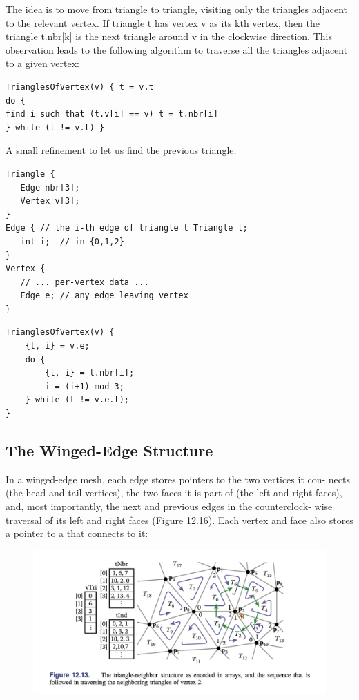 \documentclass[11pt]{article}
\numberwithin{equation}{section}
\begin{document}
The idea is to move from triangle to triangle, visiting only the triangles adjacent to the relevant vertex. If triangle t has vertex v as its kth vertex, then the triangle t.nbr[k] is the next triangle around v in the clockwise direction. This observation leads to the following algorithm to traverse all the triangles adjacent to a given vertex:
\begin{framed}
\begin{verbatim}
TrianglesOfVertex(v) { t = v.t
do {
find i such that (t.v[i] == v) t = t.nbr[i]
} while (t != v.t) }
\end{verbatim}
\end{framed}
A small refinement to let us find the previous triangle:
\begin{framed}
\begin{verbatim}
Triangle {
   Edge nbr[3];
   Vertex v[3];
}
Edge { // the i-th edge of triangle t Triangle t;
   int i;  // in {0,1,2}
}
Vertex {
   // ... per-vertex data ...
   Edge e; // any edge leaving vertex
}

\end{verbatim}
\end{framed}

\begin{framed}
\begin{verbatim}
TrianglesOfVertex(v) { 
	{t, i} = v.e;
	do {
		{t, i} = t.nbr[i];
		i = (i+1) mod 3;
	} while (t != v.e.t);
}

\end{verbatim}
\end{framed}

\subsection{The Winged-Edge Structure}
In a winged-edge mesh, each edge stores pointers to the two vertices it con- nects (the head and tail vertices), the two faces it is part of (the left and right faces), and, most importantly, the next and previous edges in the counterclock- wise traversal of its left and right faces (Figure 12.16). Each vertex and face also stores a pointer to a  that connects to it:
\begin{figure}[H]
	\centering
	\includegraphics[scale=0.4]{p21}
\end{figure}
\end{document}
